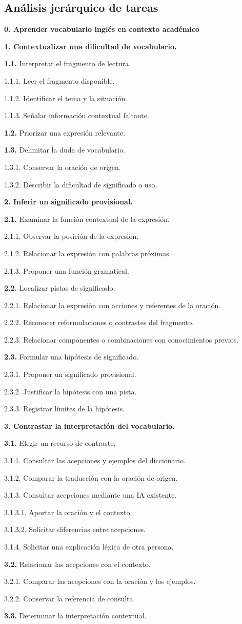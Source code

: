 \documentclass[10pt,a4paper]{article}
\newcommand{\HTAline}[3]{\par\noindent\hspace*{#1cm}\begin{minipage}{\dimexpr\linewidth-#1cm\relax}#3 #2\end{minipage}\par}
\begin{document}
\subsection*{Análisis jerárquico de tareas}
\HTAline{0.0}{\textbf{0. Aprender vocabulario inglés en contexto académico}}{}
\HTAline{0.0}{\textbf{1. Contextualizar una dificultad de vocabulario.}}{}
\HTAline{0.4}{\textbf{1.1.} Interpretar el fragmento de lectura.}{}
\HTAline{0.8}{1.1.1. Leer el fragmento disponible.}{}
\HTAline{0.8}{1.1.2. Identificar el tema y la situación.}{}
\HTAline{0.8}{1.1.3. Señalar información contextual faltante.}{}
\HTAline{0.4}{\textbf{1.2.} Priorizar una expresión relevante.}{}
\HTAline{0.4}{\textbf{1.3.} Delimitar la duda de vocabulario.}{}
\HTAline{0.8}{1.3.1. Conservar la oración de origen.}{}
\HTAline{0.8}{1.3.2. Describir la dificultad de significado o uso.}{}
\HTAline{0.0}{\textbf{2. Inferir un significado provisional.}}{}
\HTAline{0.4}{\textbf{2.1.} Examinar la función contextual de la expresión.}{}
\HTAline{0.8}{2.1.1. Observar la posición de la expresión.}{}
\HTAline{0.8}{2.1.2. Relacionar la expresión con palabras próximas.}{}
\HTAline{0.8}{2.1.3. Proponer una función gramatical.}{}
\HTAline{0.4}{\textbf{2.2.} Localizar pistas de significado.}{}
\HTAline{0.8}{2.2.1. Relacionar la expresión con acciones y referentes de la oración.}{}
\HTAline{0.8}{2.2.2. Reconocer reformulaciones o contrastes del fragmento.}{}
\HTAline{0.8}{2.2.3. Relacionar componentes o combinaciones con conocimientos previos.}{}
\HTAline{0.4}{\textbf{2.3.} Formular una hipótesis de significado.}{}
\HTAline{0.8}{2.3.1. Proponer un significado provisional.}{}
\HTAline{0.8}{2.3.2. Justificar la hipótesis con una pista.}{}
\HTAline{0.8}{2.3.3. Registrar límites de la hipótesis.}{}
\HTAline{0.0}{\textbf{3. Contrastar la interpretación del vocabulario.}}{}
\HTAline{0.4}{\textbf{3.1.} Elegir un recurso de contraste.}{}
\HTAline{0.8}{3.1.1. Consultar las acepciones y ejemplos del diccionario.}{}
\HTAline{0.8}{3.1.2. Comparar la traducción con la oración de origen.}{}
\HTAline{0.8}{3.1.3. Consultar acepciones mediante una IA existente.}{}
\HTAline{1.2000000000000002}{3.1.3.1. Aportar la oración y el contexto.}{}
\HTAline{1.2000000000000002}{3.1.3.2. Solicitar diferencias entre acepciones.}{}
\HTAline{0.8}{3.1.4. Solicitar una explicación léxica de otra persona.}{}
\HTAline{0.4}{\textbf{3.2.} Relacionar las acepciones con el contexto.}{}
\HTAline{0.8}{3.2.1. Comparar las acepciones con la oración y los ejemplos.}{}
\HTAline{0.8}{3.2.2. Conservar la referencia de consulta.}{}
\HTAline{0.4}{\textbf{3.3.} Determinar la interpretación contextual.}{}
\end{document}
